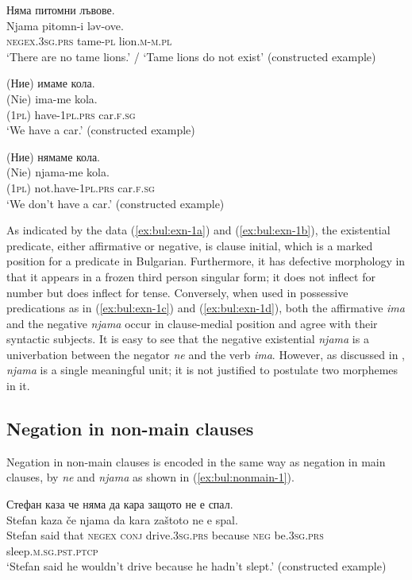 \documentclass[output=paper,colorlinks=true, citecolor=brown]{langscibook}
\begin{document}
 \ex Няма питомни лъвове.\label{ex:bul:exn-1b}\\ 
  	\gll Njama pitomn-i ləv-ove.\\
    \textsc{negex}.\textsc{3sg.prs} tame-\textsc{pl} lion.\textsc{m}-\textsc{m.pl}\\
\glt `There are no tame lions.' / `Tame lions do not exist' (constructed example)

\ex (Ние) имаме кола. \label{ex:bul:exn-1c}\\
\gll (Nie) ima-me kola.\\
(\textsc{1pl}) have-\textsc{1pl.prs} car.\textsc{f.sg}\\
\glt `We have a car.' (constructed example)

  \ex (Ние) нямаме кола. \label{ex:bul:exn-1d}\\
  	\gll (Nie) njama-me kola.\\
     (\textsc{1pl}) not.have-\textsc{1pl.prs} car.\textsc{f.sg}\\
\glt `We don't have a car.' (constructed example)

\z \z

As indicated by the data (\ref{ex:bul:exn-1a}) and (\ref{ex:bul:exn-1b}), the existential predicate, either affirmative or negative, is clause initial, which is a marked position for a predicate in Bulgarian. Furthermore, it has defective morphology in that it appears in a frozen third person singular form; it does not inflect for number but does inflect for tense. Conversely, when used in possessive predications as in (\ref{ex:bul:exn-1c}) and (\ref{ex:bul:exn-1d}), both the affirmative \textit{ima} and the negative \textit{njama} occur in clause-medial position and agree with their syntactic subjects. It is easy to see that the negative existential \textit{njama} is a univerbation between the negator \textit{ne} and the verb \textit{ima}. However, as discussed in , \textit{njama} is a single meaningful unit; it is not justified to postulate two morphemes in it.

\subsection{Negation in non-main clauses} 
Negation in non-main clauses is encoded in the same way as negation in main clauses, by \textit{ne} and \textit{njama} as shown in (\ref{ex:bul:nonmain-1}).

\ea  
  Стефан каза че няма да кара защото не е спал.\\ \label{ex:bul:nonmain-1}
  	\gll Stefan kaza če njama da kara zaštoto ne e spal.\\
     Stefan said that \textsc{negex} \textsc{conj} drive.\textsc{3sg.prs} because \textsc{neg} be.\textsc{3sg.prs} sleep.\textsc{m.sg.pst.ptcp}\\
\glt `Stefan said he wouldn't drive because he hadn't slept.' (constructed example)
\end{document}
